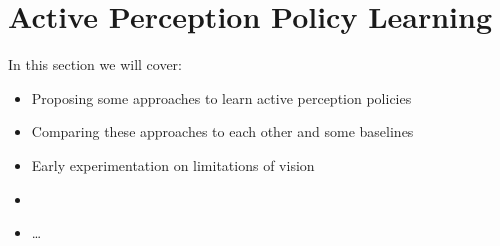 \chapter{Active Perception Policy Learning}
In this section we will cover:
  \begin{itemize}
    \item Proposing some approaches to learn active perception policies
    \item Comparing these approaches to each other and some baselines 
    \item Early experimentation on limitations of vision
    \item 
    \item \ldots
  \end{itemize}
  
